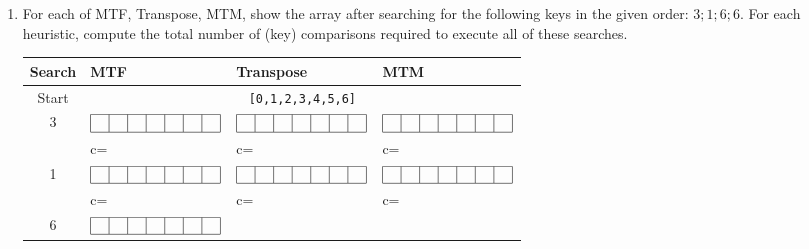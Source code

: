\begin{enumerate}

\item For each of MTF, Transpose, MTM, show the array after searching for
the following keys in the given order: $3; 1; 6; 6.$
%
For each heuristic, compute the total number of (key) comparisons
required to execute all of these searches.

\begin{spaceForAnswer}
\begin{tabular}{|c|p{3.2cm}|p{3.2cm}|p{3.2cm}|}
\hline
Search & MTF & Transpose & MTM\\
\hline
\hline
Start&
\multicolumn{3}{|c|}{\tt [0,1,2,3,4,5,6]}\\
\hline
\hline
3
&$\begin{array}{|c|c|c|c|c|c|c|}\hline\ &\ &\ &\ &\ &\ &\ \\ \hline\end{array}$
&$\begin{array}{|c|c|c|c|c|c|c|}\hline\ &\ &\ &\ &\ &\ &\ \\ \hline\end{array}$
&$\begin{array}{|c|c|c|c|c|c|c|}\hline\ &\ &\ &\ &\ &\ &\ \\ \hline\end{array}$
\\
&
c= \hspace{.5cm} &
c= \hspace{.5cm} &
c= \hspace{.5cm} \\
\hline
1
&$\begin{array}{|c|c|c|c|c|c|c|}\hline\ &\ &\ &\ &\ &\ &\ \\ \hline\end{array}$
&$\begin{array}{|c|c|c|c|c|c|c|}\hline\ &\ &\ &\ &\ &\ &\ \\ \hline\end{array}$
&$\begin{array}{|c|c|c|c|c|c|c|}\hline\ &\ &\ &\ &\ &\ &\ \\ \hline\end{array}$
\\
&
c= \hspace{.5cm} &
c= \hspace{.5cm} &
c= \hspace{.5cm} \\
\hline
6
&$\begin{array}{|c|c|c|c|c|c|c|}\hline\ &\ &\ &\ &\ &\ &\ \\ \hline\end{array}$

\end{tabular}
\end{spaceForAnswer}
\end{enumerate}
